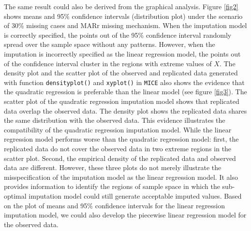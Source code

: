 \documentclass[12pt, fullpage, a4paper]{article}
\begin{document}
The same result could also be derived from the graphical analysis. Figure \ref{fig2} shows means and 95\% confidence intervals (distribution plot) under the scenario of 30\% missing cases and MARr missing mechanism. When the imputation model is correctly specified, the points out of the 95\% confidence interval randomly spread over the sample space without any patterns. However, when the imputation is incorrectly specified as the linear regression model, the points out of the confidence interval cluster in the regions with extreme values of $X$. The density plot and the scatter plot of the observed and replicated data generated with function \texttt{densityplot()} and \texttt{xyplot()} in \texttt{MICE} also shows the evidence that the quadratic regression is preferable than the linear model (see figure \ref{fig3}). The scatter plot of the quadratic regression imputation model shows that replicated data overlap the observed data. The density plot shows the replicated data shares the same distribution with the observed data. This evidence illustrates the compatibility of the quadratic regression imputation model. While the linear regression model performs worse than the quadratic regression model: first, the replicated data do not cover the observed data in two extreme regions in the scatter plot. Second, the empirical density of the replicated data and observed data are different. However, these three plots do not merely illustrate the misspecification of the imputation model as the linear regression model. It also provides information to identify the regions of sample space in which the sub-optimal imputation model could still generate acceptable imputed values. Based on the plot of means and 95\% confidence intervals for the linear regression imputation model, we could also develop the piecewise linear regression model for the observed data. 
\end{document}
